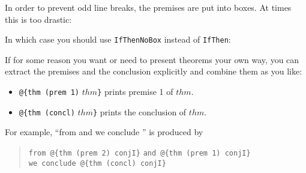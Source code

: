 \begin{isabellebody}
\begin{isamarkuptext}
In order to prevent odd line breaks, the premises are put into boxes.
At times this is too drastic:
\begin{theorem}
\end{theorem}
In which case you should use \texttt{IfThenNoBox} instead of
\texttt{IfThen}:
\begin{theorem}
\end{theorem}%
\end{isamarkuptext}%
\isamarkuptrue%
%
\isamarkuptrue%
%
\begin{isamarkuptext}%
If for some reason you want or need to present theorems your
own way, you can extract the premises and the conclusion explicitly
and combine them as you like:
\begin{itemize}
\item \verb!@!\verb!{thm (prem 1)! $thm$\verb!}!
prints premise 1 of $thm$.
\item \verb!@!\verb!{thm (concl)! $thm$\verb!}!
prints the conclusion of $thm$.
\end{itemize}
For example, ``from  and
 we conclude ''
is produced by
\begin{quote}
\verb!from !\verb!@!\verb!{thm (prem 2) conjI}! \verb!and !\verb!@!\verb!{thm (prem 1) conjI}!\\
\verb!we conclude !\verb!@!\verb!{thm (concl) conjI}!

\end{quote}
\end{isamarkuptext}
\end{isabellebody}

